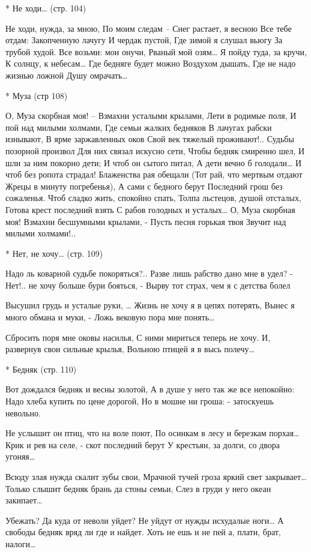 * Не ходи… (стр. 104)

Не ходи, нужда, за мною,
По моим следам –
Снег растает, я весною
Все тебе отдам:
Закопченную лачугу
И чердак пустой,
Где зимой я слушал вьюгу
За трубой худой.
Все возьми: мои онучи,
Рваный мой озям…
Я пойду туда, за кручи,
К солнцу, к небесам…
Где бедняге будет можно
Воздухом дышать,
Где не надо жизнью ложной
Душу омрачать…


* Муза (стр 108)

О, Муза скорбная моя! –
Взмахни усталыми крылами,
Лети в родимые поля,
И пой над милыми холмами,
Где семьи жалких бедняков
В лачугах рабски изнывают,
В ярме заржавленных оков
Свой век тяжелый проживают!..
Судьбы позорной произвол
Для них связал искусно сети,
Чтобы бедняк смиренно шел,
И шли за ним покорно дети;
И чтоб он сытого питал,
А дети вечно б голодали…
И чтоб без ропота страдал!
Блаженства рая обещали
(Тот рай, что мертвым отдают
Жрецы в минуту погребенья),
А сами с бедного берут
Последний грош без сожаленья.
Чтоб сладко жить, спокойно спать,
Толпа льстецов, душой отсталых,
Готова крест последний взять
С рабов голодных и усталых…
О, Муза скорбная моя!
Взмахни бесшумными крылами, -
Пусть песня горькая твоя
Звучит над милыми холмами!..


* Нет, не хочу… (стр. 109)

Надо ль коварной судьбе покоряться?..
Разве лишь рабство дано мне в удел?
- Нет!.. не хочу больше бури бояться, -
Вырву тот страх, чем я с детства болел

Высушил грудь и усталые руки, …
Жизнь не хочу я в цепях потерять,
Вынес я много обмана и муки, -
Ложь вековую пора мне понять…

Сбросить поря мне оковы насилья,
С ними мириться теперь не хочу.
И, развернув свои сильные крылья,
Вольною птицей я в высь полечу…


* Бедняк (стр. 110)

Вот дождался бедняк и весны золотой,
А в душе у него так же все непокойно:
Надо хлеба купить по цене дорогой,
Но в мошне ни гроша: - затоскуешь невольно.

Не услышит он птиц, что на воле поют,
По осинкам в лесу и березкам порхая…
Крик и рев на селе, - скот последний берут
У крестьян, за долги, со двора угоняя…

Всюду злая нужда скалит зубы свои,
Мрачной тучей гроза яркий свет закрывает…
Только слышит бедняк брань да стоны семьи,
Слез в груди у него океан закипает…

Убежать? Да куда от неволи уйдет?
Не уйдут от нужды исхудалые ноги…
А свободы бедняк вряд ли где и найдет.
Хоть не ешь и не пей а, плати, брат, налоги…


